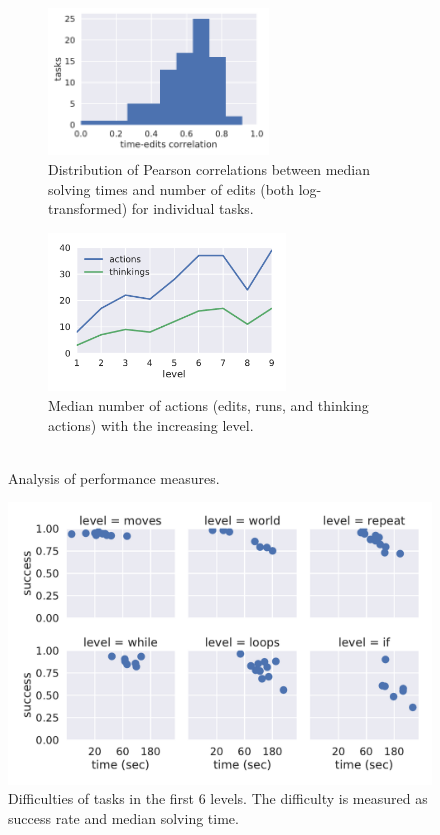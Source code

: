 \begin{figure}[htb]
\centering
\begin{subfigure}{.49\textwidth}
\centering
\includegraphics[height=39mm]{img/time-edits-corr}
\caption{
  Distribution of Pearson correlations between median solving times and number
  of edits (both log-transformed) for individual tasks.}
\label{fig:time-vs-edits}
\end{subfigure}
\begin{subfigure}{.49\textwidth}
\centering
\includegraphics[height=42mm]{img/actions-thinkings}
\caption{Median number of actions (edits, runs, and thinking actions)
  with the increasing level.\\~}
\label{fig:actions-thinkings}
\end{subfigure}
\caption{Analysis of performance measures.}
\end{figure}


\begin{figure}[htb]
\centering
\includegraphics[width=\textwidth]{img/difficulties-tasks-levels}
\caption{%
  Difficulties of tasks in the first 6 levels.
  The difficulty is measured as success rate and median solving time.}
\label{fig:difficulties-tasks-levels}
\end{figure}




